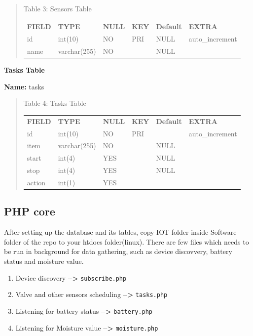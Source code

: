 \documentclass[16pt]{article}
\begin{document}
\begin{quote}
	\centering
	\caption{Table 3: Sensors Table}
	\label{my-label}
	\begin{tabular}{llllll}
		{\bf FIELD} & {\bf TYPE}   & {\bf NULL} & {\bf KEY} & {\bf Default} & {\bf EXTRA}     \\
		id          & int(10)      & NO         & PRI       & NULL          & auto\_increment \\
		name        & varchar(255) & NO         &           & NULL          &                
	\end{tabular}

\end{quote}
\textbf{Tasks Table}

\textbf{Name:} tasks
\begin{quote}
\centering
\caption{Table 4: Tasks Table}
\label{my-label}
\begin{tabular}{llllll}
	{\bf FIELD} & {\bf TYPE}   & {\bf NULL} & {\bf KEY} & {\bf Default} & {\bf EXTRA}     \\
	id          & int(10)      & NO         & PRI       &           & auto\_increment \\
	item        & varchar(255) & NO         &           & NULL          &                 \\
	start       & int(4)       & YES        &           & NULL          &                 \\
	stop        & int(4)       & YES        &           & NULL          &                 \\
	action      & int(1)       & YES        &           &               &                
\end{tabular}
\end{quote}






\subsection{PHP core}

After setting up the database and its tables, copy IOT folder inside Software folder of the repo to your htdocs folder(linux).
There are few files which needs to be run in background for data gathering, such as device discovvery, battery status and moisture value.

\begin{enumerate}

\item Device discovery \textbf{--\textgreater{}}
\texttt{subscribe.php}
\item Valve and other sensors scheduling
\textbf{--\textgreater{}} \texttt{tasks.php} 
\item Listening for battery status \textbf{--\textgreater{}} \texttt{battery.php} 
\item Listening for Moisture value \textbf{--\textgreater{}} \texttt{moisture.php}

\end{enumerate}
\end{document}
